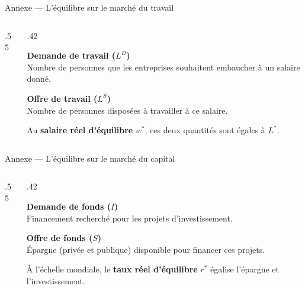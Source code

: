 \documentclass[aspectratio=169]{beamer}
\begin{document}
\begin{frame}[c]{Annexe — L’équilibre sur le marché du travail}
  \begin{columns}[c,onlytextwidth]
    \begin{column}{.55\textwidth}
    \end{column}
    \begin{column}{.42\textwidth}
      \raggedright\small
      \textbf{Demande de travail ($L^{D}$)}\\[4pt]
      Nombre de personnes que les entreprises souhaitent embaucher à un salaire donné.
      \par\vspace{.30cm}
      \textcolor{offreEMBA}{\textbf{Offre de travail ($L^{S}$)}}\\[4pt]
      Nombre de personnes disposées à travailler à ce salaire.
      \par\vspace{.30cm}
      Au \textbf{salaire réel d’équilibre} $w^{*}$, ces deux quantités sont égales à $L^{*}$.
    \end{column}
  \end{columns}
\end{frame}

\begin{frame}[c]{Annexe — L’équilibre sur le marché du capital}
  \begin{columns}[c,onlytextwidth]
    \begin{column}{.55\textwidth}
    \end{column}
    \begin{column}{.42\textwidth}
      \raggedright\small
      \textbf{Demande de fonds ($I$)}\\[4pt]
      Financement recherché pour les projets d’investissement.
      \par\vspace{.30cm}
      \textcolor{offreEMBA}{\textbf{Offre de fonds ($S$)}}\\[4pt]
      Épargne (privée et publique) disponible pour financer ces projets.
      \par\vspace{.30cm}
      À l’échelle mondiale, le \textbf{taux réel d’équilibre} $r^{*}$ égalise l’épargne et l’investissement.
    \end{column}
  \end{columns}
\end{frame}
\end{document}
